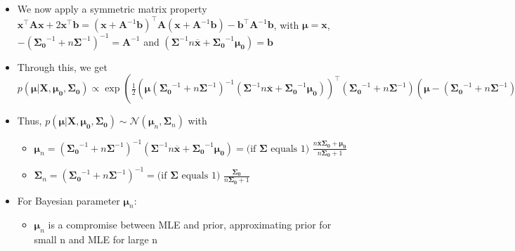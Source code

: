 \begin{itemize}
    \item We now apply a symmetric matrix property $\boldsymbol{x}^\intercal \boldsymbol{A} \boldsymbol{x} + 2 \boldsymbol{x}^\intercal \boldsymbol{b} = ( \boldsymbol{x} + \boldsymbol{A}^{-1} \boldsymbol{b} )^\intercal \boldsymbol{A} ( \boldsymbol{x} + \boldsymbol{A}^{-1} \boldsymbol{b} ) - \boldsymbol{b}^\intercal \boldsymbol{A}^{-1} \boldsymbol{b}$, with $\boldsymbol{\mu} = \boldsymbol{x}$, $-( \boldsymbol{\Sigma_0}^{-1} + n \boldsymbol{\Sigma}^{-1} )^{-1} = \boldsymbol{A}^{-1}$ and $(\boldsymbol{\Sigma}^{-1} n \overline{\boldsymbol{x}} + \boldsymbol{\Sigma_0}^{-1} \boldsymbol{\mu_0}) = \boldsymbol{b}$
    \item Through this, we get $p(\boldsymbol{\mu} | \boldsymbol{X}, \boldsymbol{\mu_0}, \boldsymbol{\Sigma_0}) \propto \exp (  \frac{1}{2}  ( \boldsymbol{\mu} (  \boldsymbol{\Sigma_0}^{-1} + n \boldsymbol{\Sigma}^{-1} )^{-1} ( \boldsymbol{\Sigma}^{-1} n \overline{\boldsymbol{x}} + \boldsymbol{\Sigma_0}^{-1} \boldsymbol{\mu_0} ) )^\intercal ( \boldsymbol{\Sigma_0}^{-1} + n \boldsymbol{\Sigma}^{-1} ) ( \boldsymbol{\mu} - ( \boldsymbol{\Sigma_0}^{-1} + n \boldsymbol{\Sigma}^{-1} )^{-1} ( \boldsymbol{\Sigma}^{-1} n \overline{\boldsymbol{x}} + \boldsymbol{\Sigma_0}^{-1} \boldsymbol{\mu_0} ) ) ) = exp( \frac{1}{2} ( \boldsymbol{\mu} - \boldsymbol{\mu}_n )^\intercal  \boldsymbol{\Sigma}_n^{-1} ( \boldsymbol{\mu} - \boldsymbol{\mu}_n ) )$
    \item Thus, $p(\boldsymbol{\mu} | \boldsymbol{X}, \boldsymbol{\mu_0}, \boldsymbol{\Sigma_0}) \sim \mathcal{N}(\boldsymbol{\mu}_n, \boldsymbol{\Sigma}_n)$ with
    \begin{itemize}
        \item $\boldsymbol{\mu}_n = (\boldsymbol{\Sigma_0}^{-1} + n \boldsymbol{\Sigma}^{-1})^{-1} (\boldsymbol{\Sigma}^{-1} n \overline{\boldsymbol{x}} + \boldsymbol{\Sigma_0}^{-1} \boldsymbol{\mu_0}) = \textrm{(if } \boldsymbol{\Sigma} \textrm{ equals 1) } \frac{n \overline{\boldsymbol{x}} \boldsymbol{\Sigma_0} + \boldsymbol{\mu_0}}{n \boldsymbol{\Sigma_0} + 1}$
        \item $\boldsymbol{\Sigma}_n = (\boldsymbol{\Sigma_0}^{-1} + n \boldsymbol{\Sigma}^{-1})^{-1} = \textrm{(if } \boldsymbol{\Sigma} \textrm{ equals 1) } \frac{\boldsymbol{\Sigma_0}}{n \boldsymbol{\Sigma_0} + 1}$
    \end{itemize}
    \item For Bayesian parameter $\boldsymbol{\mu}_n$: \begin{itemize}
        \item $\boldsymbol{\mu}_n$ is a compromise between MLE and prior, approximating prior for small n and MLE for large n

\end{itemize}
\end{itemize}
